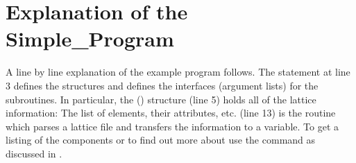 \section{Explanation of the Simple_Program}

A line by line explanation of the example program follows. The  statement at line 3 defines the \bmad structures and defines the
interfaces (argument lists) for the \bmad subroutines. In particular,
the  () structure (line 5) holds all
of the lattice information: The list of elements, their attributes, etc.
 (line 13) is the routine which parses a lattice file
and transfers the information to a  variable. To get a
listing of the  components or to find out more about
 use the  command as discussed in .

